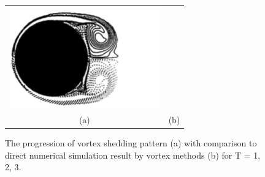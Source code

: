 \begin{figure}
\begin{center}
\begin{tabular}{cc}
 \includegraphics[width=6.5cm]{./Figures/results/static/KOU_Re1000_T3.png}  \\
 (a) & (b) \\
 \end{tabular}
\end{center}
 \caption[Vortex shedding pattern in the wake]{The progression of vortex shedding pattern (a) with comparison to direct numerical simulation result by vortex methods (b) for T = 1, 2, 3. }
 \label{fig:Wake1}
\end{figure}

